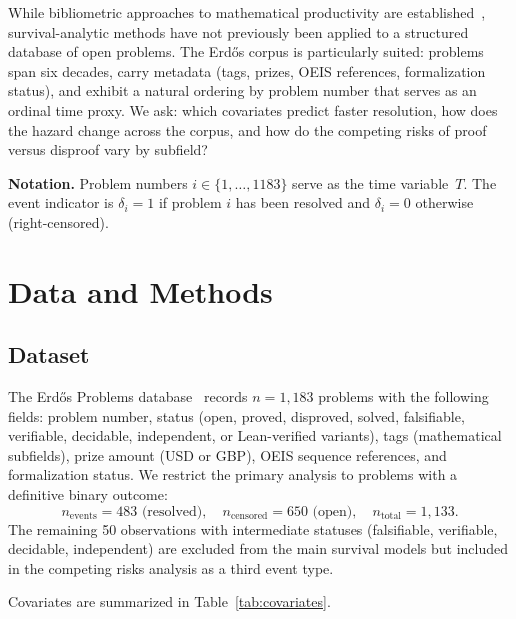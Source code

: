 \documentclass[11pt]{article}
\begin{document}
While bibliometric approaches to mathematical productivity are
established~\cite{borjas2015,mihaljevi2019}, survival-analytic
methods have not previously been applied to a structured database of
open problems. The Erd\H{o}s corpus is particularly suited: problems
span six decades, carry metadata (tags, prizes, OEIS references,
formalization status), and exhibit a natural ordering by problem
number that serves as an ordinal time proxy.
We ask: which covariates predict faster resolution, how does the
hazard change across the corpus, and how do the competing risks
of proof versus disproof vary by subfield?

\smallskip\noindent
\textbf{Notation.}
Problem numbers $i \in \{1, \ldots, 1183\}$ serve as the
time variable~$T$. The event indicator is $\delta_i = 1$ if problem
$i$ has been resolved and $\delta_i = 0$ otherwise (right-censored).


\section{Data and Methods}

\subsection{Dataset}

The Erd\H{o}s Problems database~\cite{erdosproblems} records
$n = 1{,}183$ problems with the following fields: problem number,
status (open, proved, disproved, solved, falsifiable, verifiable,
decidable, independent, or Lean-verified variants), tags
(mathematical subfields), prize amount (USD or GBP), OEIS sequence
references, and formalization status. We restrict the primary analysis
to problems with a definitive binary outcome:
\[
  n_{\text{events}} = 483 \text{ (resolved)}, \quad
  n_{\text{censored}} = 650 \text{ (open)}, \quad
  n_{\text{total}} = 1{,}133.
\]
The remaining 50 observations with intermediate statuses
(falsifiable, verifiable, decidable, independent) are excluded
from the main survival models but included in the competing risks
analysis as a third event type.

Covariates are summarized in Table~\ref{tab:covariates}.
\end{document}
